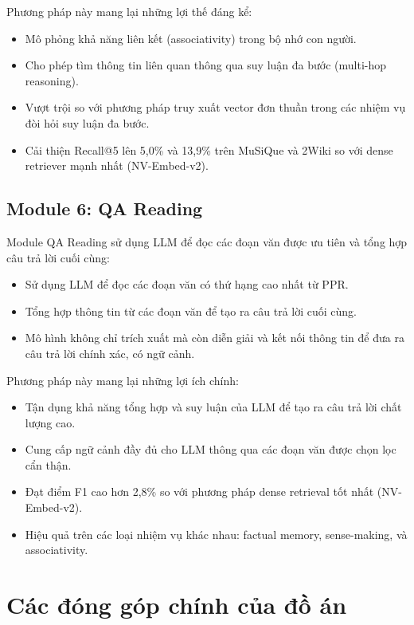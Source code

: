 \documentclass[../main.tex]{subfiles}
\begin{document}
Phương pháp này mang lại những lợi thế đáng kể:
\begin{itemize}
\item Mô phỏng khả năng liên kết (associativity) trong bộ nhớ con người.
\item Cho phép tìm thông tin liên quan thông qua suy luận đa bước (multi-hop reasoning).
\item Vượt trội so với phương pháp truy xuất vector đơn thuần trong các nhiệm vụ đòi hỏi suy luận đa bước.
\item Cải thiện Recall@5 lên 5,0\% và 13,9\% trên MuSiQue và 2Wiki so với dense retriever mạnh nhất (NV-Embed-v2).
\end{itemize}

\subsection{Module 6: QA Reading}
Module QA Reading sử dụng LLM để đọc các đoạn văn được ưu tiên và tổng hợp câu trả lời cuối cùng:

\begin{itemize}
\item Sử dụng LLM để đọc các đoạn văn có thứ hạng cao nhất từ PPR.
\item Tổng hợp thông tin từ các đoạn văn để tạo ra câu trả lời cuối cùng.
\item Mô hình không chỉ trích xuất mà còn diễn giải và kết nối thông tin để đưa ra câu trả lời chính xác, có ngữ cảnh.
\end{itemize}

Phương pháp này mang lại những lợi ích chính:
\begin{itemize}
\item Tận dụng khả năng tổng hợp và suy luận của LLM để tạo ra câu trả lời chất lượng cao.
\item Cung cấp ngữ cảnh đầy đủ cho LLM thông qua các đoạn văn được chọn lọc cẩn thận.
\item Đạt điểm F1 cao hơn 2,8\% so với phương pháp dense retrieval tốt nhất (NV-Embed-v2).
\item Hiệu quả trên các loại nhiệm vụ khác nhau: factual memory, sense-making, và associativity.
\end{itemize}

\section{Các đóng góp chính của đồ án}
\end{document}
